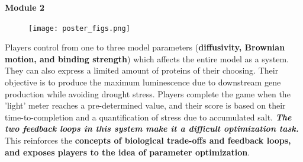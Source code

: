 \documentclass[final]{beamer}
\newlength{\onecolwid}
\newlength{\twocolwid}
\begin{document}
\begin{frame}[t]
\begin{columns}[t]
\begin{column}{\twocolwid}
\begin{columns}[t,totalwidth=\twocolwid]
\begin{column}{\onecolwid}

\end{column} %

\begin{column}{\onecolwid}\vspace{-.6in} %




\end{column} %

\end{columns} %

\vspace{-1cm}
\begin{alertblock}{\color{Grey}\textbf{Module 2}}
\begin{figure}
	\texttt{[image: poster\_figs.png]}

\end{figure}
\small {Players control from one to three model parameters (\textbf{diffusivity, Brownian motion, and binding strength}) which affects the entire model as a system. They can also express a limited amount of proteins of their choosing. Their objective is to produce the maximum luminescence due to downstream gene production while avoiding drought stress. Players complete the game when the 'light' meter reaches a pre-determined value, and their score is based on their time-to-completion and a quantification of stress due to accumulated salt.\textit{ \textbf{The two feedback loops in this system make it a difficult optimization task.}} This reinforces the \textbf{concepts of biological trade-offs and feedback loops, and exposes players to the idea of parameter optimization}.}
\end{alertblock} 



\end{column}
\end{columns}
\end{frame}
\end{document}
